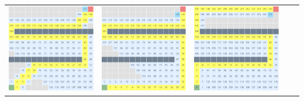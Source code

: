\documentclass{article}
\begin{document}
\begin{center}
\begin{tabular}{c c c c c}
\includegraphics[scale=0.15]{images/scr22.png} &
\includegraphics[scale=0.15]{images/scr23.png} &
\includegraphics[scale=0.15]{images/scr24.png} \\

\end{tabular}
\end{center}
\end{document}
